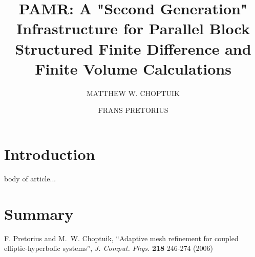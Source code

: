 \documentclass{w-edbk}
\begin{document}


\title[]{PAMR: A "Second Generation" Infrastructure for Parallel Block Structured Finite Difference and Finite Volume Calculations}


\author[Matthew W. Choptuik]{MATTHEW W. CHOPTUIK}



\author[Frans Pretorius]{FRANS PRETORIUS}





\section{Introduction}

body of article...

\section{Summary}

\begin{acknowledgments}

\end{acknowledgments}


\begin{references}
 F. Pretorius and M.~W. Choptuik,
 ``Adaptive mesh refinement for coupled elliptic-hyperbolic systems'',
 {\em J. Comput. Phys.} {\bf 218} 246-274 (2006)
\end{references}



\end{document}
